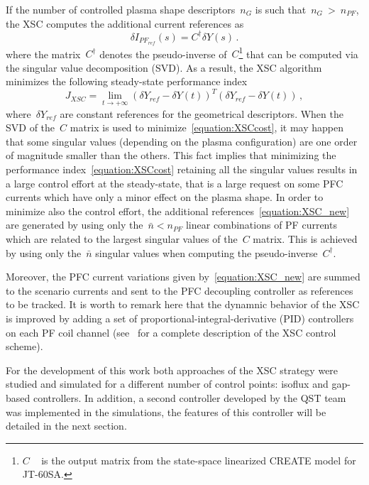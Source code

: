 If the number of controlled plasma shape descriptors~$n_G$ is such that~$n_G~>~n_{PF}$, the XSC computes the additional current references as
\begin{equation}\label{equation:XSC_new}
\delta I_{PF_{ref}}(s)=C^\dag\delta Y(s)\,.
\end{equation}
where the matrix~$C^\dag$ denotes the pseudo-inverse of~$C$\footnote{$C$ ~ is the output matrix from the state-space linearized CREATE model for JT-60SA.} that can be computed via the singular value decomposition (SVD). As a result, the XSC algorithm minimizes the following steady-state performance index
\begin{equation}\label{equation:XSCcost}
J_{XSC} = \lim_{t\to +
	\infty}(\delta Y_{ref}-\delta Y(t))^T(\delta Y_{ref}-\delta Y(t))\,,
\end{equation}
where~$\delta Y_{ref}$ are constant references for the geometrical descriptors. When the SVD of the~$C$ matrix is used to minimize~\eqref{equation:XSCcost}, it may happen that some singular values (depending on the plasma configuration) are one order of magnitude smaller than the others. This fact implies that minimizing the performance index~\eqref{equation:XSCcost} retaining all the singular values results in a large control effort at the steady-state, that is a large request on some PFC currents which have only a minor effect on the plasma shape. In order to minimize also the control effort, the additional references~\eqref{equation:XSC_new} are generated by using only the~$\bar{n}<n_{PF}$ linear combinations of PF currents which are related to the largest singular values of the~$C$ matrix. This is achieved by using only the~$\bar{n}$ singular values when computing the pseudo-inverse~$C^\dag$.
\smallskip

Moreover, the PFC current variations given by~\eqref{equation:XSC_new} are summed to the scenario currents and sent to the PFC decoupling controller as references to be tracked. It is worth to remark here that the dynamnic behavior of the XSC is improved by adding a set of proportional-integral-derivative (PID) controllers on each PF coil channel (see~\cite{Ariola:XSC} for a complete description of the XSC control scheme).
\smallskip

For the development of this work both approaches of the XSC strategy were studied and simulated for a different number of control points: isoflux and gap-based controllers. In addition, a second controller developed by the QST team was implemented in the simulations, the features of this controller will be detailed in the next section.



